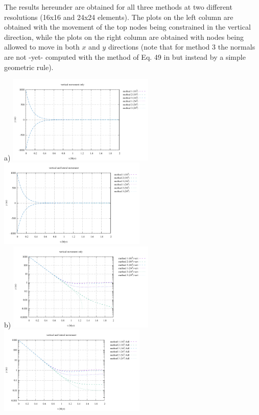 The results hereunder are obtained for all three methods at two different resolutions (16x16 
and 24x24 elements).
The plots on the left column are obtained with the movement of the top nodes being constrained in 
the vertical direction, while the plots on the right column are obtained with nodes being 
allowed to move in both $x$ and $y$ directions (note that for method 3 the normals are not -yet-
computed with the method of Eq. 49 in \cite{robh17} but instead by a simple geometric rule).

\begin{center}
a) \includegraphics[width=7cm]{python_codes/fieldstone_54/images/exp1/elevation_vert.pdf}
   \includegraphics[width=7cm]{python_codes/fieldstone_54/images/exp1/elevation_full.pdf}\\
b) \includegraphics[width=7cm]{python_codes/fieldstone_54/images/exp1/elevation_log_vert.pdf}
   \includegraphics[width=7cm]{python_codes/fieldstone_54/images/exp1/elevation_log_full.pdf}\\

\end{center}
